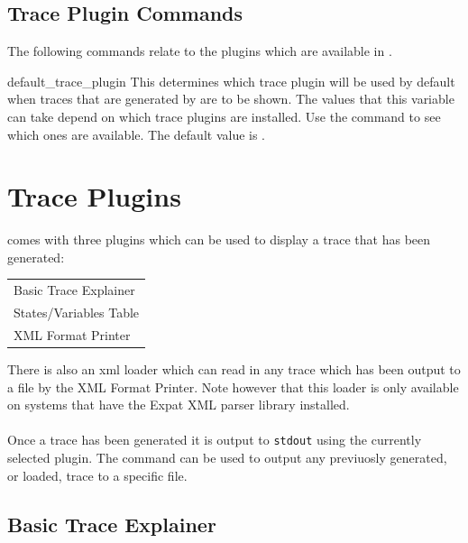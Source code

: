 \subsection{Trace Plugin Commands}
\label{Trace Plugin Commands}
The following commands relate to the plugins which are available
in \nusmv.



\begin{nusmvVar} {default\_trace\_plugin}{}{}
This determines which trace plugin will be used by default when traces
that are generated by \nusmv are to be shown. The values that this
variable can take depend on which trace plugins are installed. Use the
command
 to see which ones are available. The default
value is .
\end{nusmvVar}





\section{Trace Plugins}
\label{Trace Plugins}
\nusmv comes with three plugins which can be used to display a trace
that has been generated:

\begin{center}
\begin{tabular}{l}
Basic Trace Explainer\\
States/Variables Table\\
XML Format Printer\\
\end{tabular}
\end{center}

There is also an xml loader which can read in any trace which has been
output to a file by the XML Format Printer. Note however that this
loader is only available on systems that have the Expat XML parser
library installed.\\
\\
Once a trace has been generated it is output to \texttt{stdout} using
the currently selected plugin. The command  can
be used to output any previuosly generated, or loaded, trace to a
specific file.

\subsection{Basic Trace Explainer}
\label{Basic Trace Explainer}

